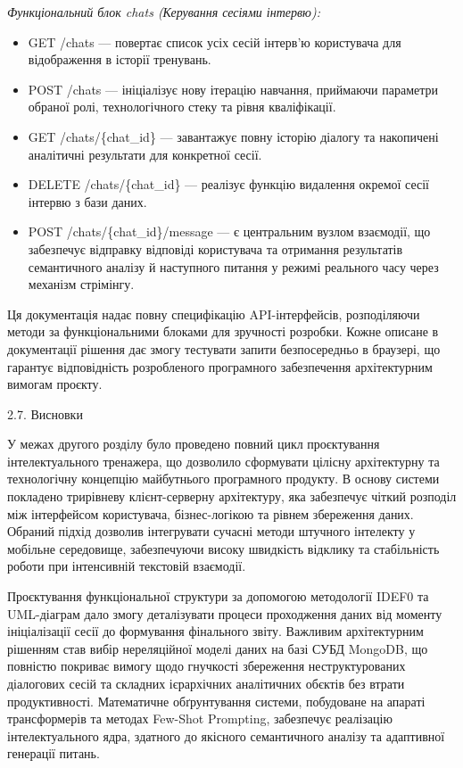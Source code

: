 \documentclass[
]{article}
\begin{document}
\emph{Функціональний блок chats (Керування сесіями
інтерв\textquotesingle ю):}

\begin{itemize}
\item
  GET /chats --- повертає список усіх сесій інтерв'ю користувача для
  відображення в історії тренувань.
\item
  POST /chats --- ініціалізує нову ітерацію навчання, приймаючи
  параметри обраної ролі, технологічного стеку та рівня кваліфікації.
\item
  GET /chats/\{chat\_id\} --- завантажує повну історію діалогу та
  накопичені аналітичні результати для конкретної сесії.
\item
  DELETE /chats/\{chat\_id\} --- реалізує функцію видалення окремої
  сесії інтерв\textquotesingle ю з бази даних.
\item
  POST /chats/\{chat\_id\}/message --- є центральним вузлом взаємодії,
  що забезпечує відправку відповіді користувача та отримання результатів
  семантичного аналізу й наступного питання у режимі реального часу
  через механізм стрімінгу.
\end{itemize}

Ця документація надає повну специфікацію API-інтерфейсів, розподіляючи
методи за функціональними блоками для зручності розробки. Кожне описане
в документації рішення дає змогу тестувати запити безпосередньо в
браузері, що гарантує відповідність розробленого програмного
забезпечення архітектурним вимогам проєкту.

\protect{}\label{_Toc228981065}{}2.7. Висновки

У межах другого розділу було проведено повний цикл проєктування
інтелектуального тренажера, що дозволило сформувати цілісну архітектурну
та технологічну концепцію майбутнього програмного продукту. В основу
системи покладено трирівневу клієнт-серверну архітектуру, яка забезпечує
чіткий розподіл між інтерфейсом користувача, бізнес-логікою та рівнем
збереження даних. Обраний підхід дозволив інтегрувати сучасні методи
штучного інтелекту у мобільне середовище, забезпечуючи високу швидкість
відклику та стабільність роботи при інтенсивній текстовій взаємодії.

Проєктування функціональної структури за допомогою методології IDEF0 та
UML-діаграм дало змогу деталізувати процеси проходження даних від
моменту ініціалізації сесії до формування фінального звіту. Важливим
архітектурним рішенням став вибір нереляційної моделі даних на базі СУБД
MongoDB, що повністю покриває вимогу щодо гнучкості збереження
неструктурованих діалогових сесій та складних ієрархічних аналітичних
об\textquotesingle єктів без втрати продуктивності. Математичне
обґрунтування системи, побудоване на апараті трансформерів та методах
Few-Shot Prompting, забезпечує реалізацію інтелектуального ядра,
здатного до якісного семантичного аналізу та адаптивної генерації
питань.
\end{document}
